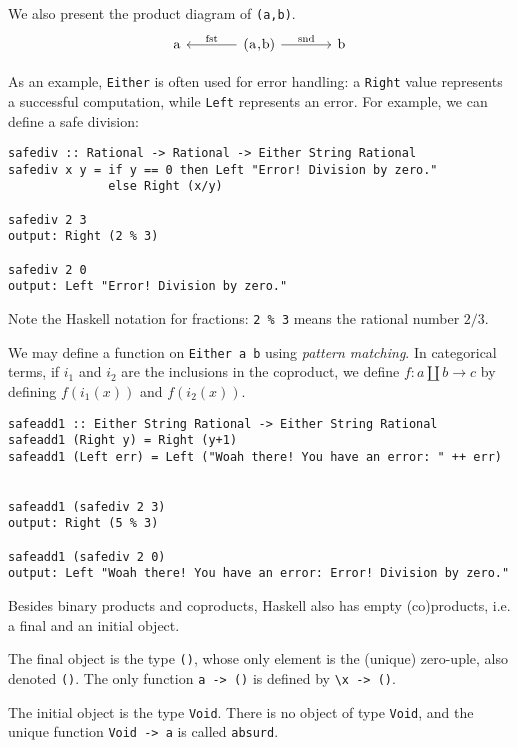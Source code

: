 \documentclass[11pt]{article}
\theoremstyle{nonumberplain}
\newcommand*\lsin{\lstinline}
\newcommand*\lsmath[1]{\text{\lstinline|#1|}}
\begin{document}
We also present the product diagram of \lsin|(a,b)|.
\begin{equation}
\begin{tikzcd}[column sep=large]
\lsmath{a} & \lsmath{(a,b)} \arrow[l, "\lsmath{fst}"'] \arrow[r, "\lsmath{snd}"] & \lsmath{b} 
\end{tikzcd}
\end{equation}

As an example, \lsin|Either| is often used for error handling: a \lsin|Right| value represents a successful computation, while \lsin|Left| represents an error. For example, we can define a safe division:
\begin{lstlisting}
safediv :: Rational -> Rational -> Either String Rational
safediv x y = if y == 0 then Left "Error! Division by zero."
              else Right (x/y)
              
safediv 2 3
output: Right (2 % 3)

safediv 2 0
output: Left "Error! Division by zero."
\end{lstlisting}

Note the Haskell notation for fractions: \lsin|2 %

We may define a function on \lsin|Either a b| using \emph{pattern matching}. In categorical terms, if $i_1$ and $i_2$ are the inclusions in the coproduct, we define $f \colon a \amalg b \to c$ by defining $f(i_1(x))$ and $f(i_2(x))$.

\begin{lstlisting}
safeadd1 :: Either String Rational -> Either String Rational
safeadd1 (Right y) = Right (y+1)
safeadd1 (Left err) = Left ("Woah there! You have an error: " ++ err)


safeadd1 (safediv 2 3)
output: Right (5 % 3)

safeadd1 (safediv 2 0)
output: Left "Woah there! You have an error: Error! Division by zero."
\end{lstlisting}

Besides binary products and coproducts, Haskell also has empty (co)products, i.e. a final and an initial object.

The final object is the type \lsin|()|, whose only element is the (unique) zero-uple, also denoted \lsin|()|. The only function \lsin|a -> ()| is defined by \lsin|\x -> ()|.

The initial object is the type \lsin|Void|. There is no object of type \lsin|Void|, and the unique function \lsin|Void -> a| is called \lsin|absurd|.
\end{document}

